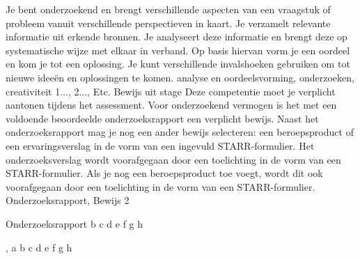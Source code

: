 
\competentie
{%
	\competentieformulier
	{%
		Je bent onderzoekend en brengt verschillende aspecten van een vraagstuk of probleem vanuit verschillende perspectieven in kaart. Je verzamelt relevante informatie uit erkende bronnen. Je analyseert deze informatie en brengt deze op systematische wijze met elkaar in verband. Op basis hiervan vorm je een oordeel en kom je tot een oplossing. Je kunt verschillende invalshoeken gebruiken om tot nieuwe ideeën en oplossingen te komen.
	}
	{%
		analyse en oordeelsvorming,%
		onderzoeken,%
		creativiteit%
	}
	{%
		1...,%
		2...,%
		Etc.%
	}
	{%
		Bewijs uit stage
	}
	{%
		Deze competentie moet je verplicht aantonen tijdens het assessment. Voor onderzoekend vermogen is het met een voldoende beoordeelde onderzoeksrapport een verplicht bewijs. Naast het onderzoeksrapport mag je nog een ander bewijs selecteren: een beroepsproduct of een ervaringsverslag in de vorm van een ingevuld STARR-formulier. Het onderzoeksverslag wordt voorafgegaan door een toelichting in de vorm van een STARR-formulier. Als je nog een beroepsproduct toe voegt, wordt dit ook voorafgegaan door een toelichting in de vorm van een STARR-formulier.
	}
	{%
		Onderzoeksrapport,%
		Bewijs 2%
	}
}
{%
	\bewijs
	{%
		Onderzoeksrapport
	}
	{%
		\starr
		{%
			b
		}
		{%
			c
		}
		{%
			d
		}
		{%
			e
		}
		{%
			f
		}
		{%
			g
		}
		{%
			h
		}
	}
	{%
		
	},
	\bewijs
	{%
		a
	}
	{%
		\starr
		{%
			b
		}
		{%
			c
		}
		{%
			d
		}
		{%
			e
		}
		{%
			f
		}
		{%
			g
		}
		{%
			h
		}
	}
	{%
		
	}
}
